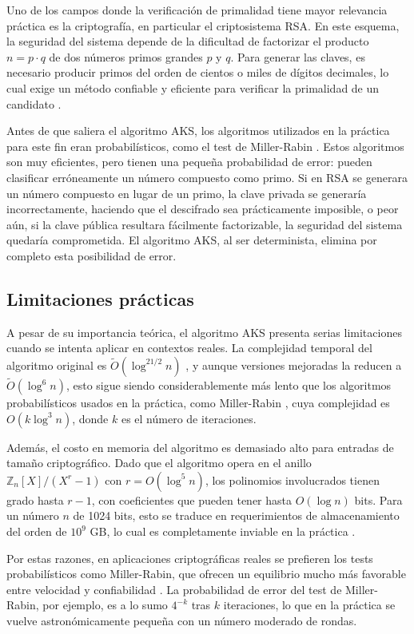 \documentclass{article}
\begin{document}
Uno de los campos donde la verificación de primalidad tiene mayor relevancia práctica
es la criptografía, en particular el criptosistema RSA. En este
esquema, la seguridad del sistema depende de la dificultad de factorizar el producto
$n = p \cdot q$ de dos números primos grandes $p$ y $q$. Para generar las claves,
es necesario producir primos del orden de cientos o miles de dígitos decimales, lo
cual exige un método confiable y eficiente para verificar la primalidad de un
candidato \cite{AKS04}.

Antes de que saliera el algoritmo AKS, los algoritmos utilizados en la práctica para este fin eran
probabilísticos, como el test de Miller-Rabin \cite{Rabin80}. Estos algoritmos son muy eficientes,
pero tienen una pequeña probabilidad de error: pueden clasificar erróneamente un
número compuesto como primo. Si en RSA se
generara un número compuesto en lugar de un primo, la clave privada se generaría
incorrectamente, haciendo que el descifrado sea prácticamente imposible, o peor aún,
si la clave pública resultara fácilmente factorizable, la seguridad del sistema
quedaría comprometida. El algoritmo AKS, al ser determinista, elimina por completo
esta posibilidad de error.

\subsection{Limitaciones prácticas}

A pesar de su importancia teórica, el algoritmo AKS presenta serias limitaciones
cuando se intenta aplicar en contextos reales. La complejidad temporal del algoritmo
original es $\tilde{O}(\log^{21/2} n)$ \cite{AKS04}, y aunque versiones mejoradas la reducen a
$\tilde{O}(\log^6 n)$, esto sigue siendo considerablemente más lento que los
algoritmos probabilísticos usados en la práctica, como Miller-Rabin \cite{Rabin80}, cuya complejidad
es $O(k \log^3 n)$, donde $k$ es el número de iteraciones.

Además, el costo en memoria del algoritmo es demasiado alto para entradas de tamaño
criptográfico. Dado que el algoritmo opera en el anillo $\mathbb{Z}_n[X]/(X^r - 1)$
con $r = O(\log^5 n)$, los polinomios involucrados tienen grado hasta $r - 1$, con
coeficientes que pueden tener hasta $O(\log n)$ bits. Para un número $n$ de 1024
bits, esto se traduce en requerimientos de almacenamiento del orden de $10^9$ GB,
lo cual es completamente inviable en la práctica \cite{Cao14}.

Por estas razones, en aplicaciones criptográficas reales se prefieren los tests
probabilísticos como Miller-Rabin, que ofrecen un equilibrio mucho
más favorable entre velocidad y confiabilidad \cite{Rabin80}. La probabilidad de error del test
de Miller-Rabin, por ejemplo, es a lo sumo $4^{-k}$ tras $k$ iteraciones, lo que
en la práctica se vuelve astronómicamente pequeña con un número moderado de rondas.
\end{document}
